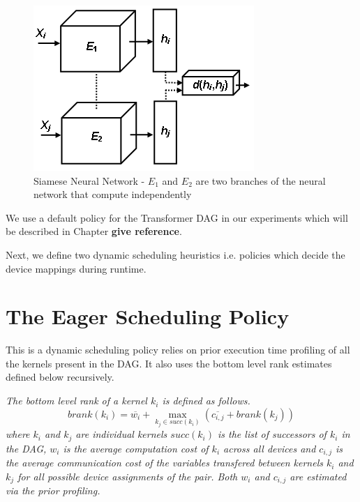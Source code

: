 \begin{figure}[H]
    \centering
    \includegraphics[scale=0.45]{Pictures/siamese.png}
    \caption{\small Siamese Neural Network - $E_{1}$ and $E_{2}$ are two branches of the neural network that compute independently\label{fig:siamese network}}
\end{figure}

We use a default policy for the Transformer DAG in our experiments which will be described in Chapter \textbf{give reference}. 
\par Next, we define two dynamic scheduling heuristics i.e. policies which decide the device mappings during runtime. 


\section{The Eager Scheduling Policy}
This is a dynamic scheduling policy relies on prior execution time profiling of all the kernels present in the DAG. It also uses the bottom level rank estimates defined below recursively. 

\begin{definition}
    \emph{The bottom level rank of a kernel $k_{i}$ is defined as follows.}
    \begin{equation} \label{eqn:brank_kernel}
        brank(k_{i}) = \overline{w_{i}} + \max_{k_{j} \in succ({k_{i}})}(\overline{c_{i,j}}+brank(k_{j}))
    \end{equation}
    \emph{where $k_{i}$ and $k_{j}$ are individual kernels $succ(k_{i})$ is the list of successors of $k_{i}$ in the DAG, $w_{i}$ is the average computation cost of $k_{i}$ across all devices and $c_{i,j}$ is the average communication cost of the variables transfered between kernels $k_{i}$ and $k_{j}$ for all possible device assignments of the pair. Both $w_{i}$ and $c_{i,j}$ are estimated via the prior profiling. }
\end{definition}

